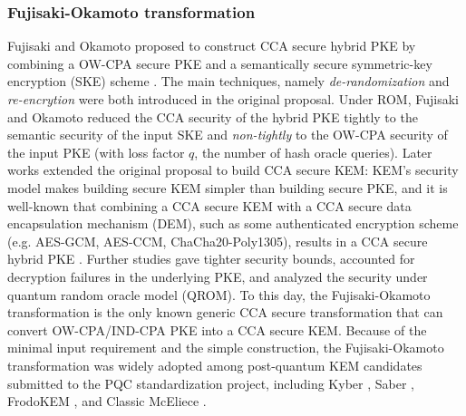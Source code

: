\documentclass[runningheads]{llncs}
\begin{document}
\subsubsection{Fujisaki-Okamoto transformation}
Fujisaki and Okamoto proposed to construct CCA secure hybrid PKE by combining a OW-CPA secure PKE and a semantically secure symmetric-key encryption (SKE) scheme \cite{DBLP:conf/crypto/FujisakiO99}. The main techniques, namely \textit{de-randomization} and \textit{re-encrytion} were both introduced in the original proposal. Under ROM, Fujisaki and Okamoto reduced the CCA security of the hybrid PKE tightly to the semantic security of the input SKE and \textit{non-tightly} to the OW-CPA security of the input PKE (with loss factor $q$, the number of hash oracle queries). Later works extended the original proposal to build CCA secure KEM: KEM's security model makes building secure KEM simpler than building secure PKE, and it is well-known that combining a CCA secure KEM with a CCA secure data encapsulation mechanism (DEM), such as some authenticated encryption scheme (e.g. AES-GCM, AES-CCM, ChaCha20-Poly1305), results in a CCA secure hybrid PKE \cite{DBLP:journals/iacr/Shoup01,DBLP:conf/eurocrypt/Shoup00a}. Further studies \cite{DBLP:conf/ima/Dent03,DBLP:conf/tcc/HofheinzHK17,DBLP:journals/iacr/BernsteinP18,DBLP:conf/asiacrypt/HovelmannsHM22,DBLP:conf/pqcrypto/XagawaY19,DBLP:conf/crypto/JiangZCWM18} gave tighter security bounds, accounted for decryption failures in the underlying PKE, and analyzed the security under quantum random oracle model (QROM). To this day, the Fujisaki-Okamoto transformation is the only known generic CCA secure transformation that can convert OW-CPA/IND-CPA PKE into a CCA secure KEM. Because of the minimal input requirement and the simple construction, the Fujisaki-Okamoto transformation was widely adopted among post-quantum KEM candidates submitted to the PQC standardization project, including Kyber \cite{DBLP:conf/eurosp/BosDKLLSSSS18}, Saber \cite{DBLP:conf/africacrypt/DAnversKRV18}, FrodoKEM \cite{DBLP:conf/ccs/BosCDMNNRS16}, and Classic McEliece \cite{DBLP:conf/ches/BernsteinCS13}.
\end{document}
